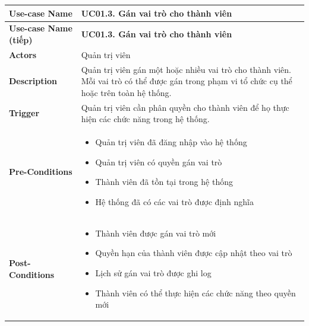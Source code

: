\renewcommand{\arraystretch}{1.3}
\begin{longtable}{|m{}|m{}|}
 \hline

\textbf{Use-case Name} & \textbf{UC01.3. Gán vai trò cho thành viên} \\ \hline
\endfirsthead

\hline
\textbf{Use-case Name (tiếp)} & \textbf{UC01.3. Gán vai trò cho thành viên} \\ \hline
\endhead

\textbf{Actors} 
& Quản trị viên \\ 
\hline

\textbf{Description} 
& Quản trị viên gán một hoặc nhiều vai trò cho thành viên. Mỗi vai trò có thể được gán trong phạm vi tổ chức cụ thể hoặc trên toàn hệ thống. \\ 
\hline

\textbf{Trigger} 
& Quản trị viên cần phân quyền cho thành viên để họ thực hiện các chức năng trong hệ thống. \\ 
\hline

\textbf{Pre-Conditions} 
&
\begin{itemize}[label=--]
    \item Quản trị viên đã đăng nhập vào hệ thống
    \item Quản trị viên có quyền gán vai trò
    \item Thành viên đã tồn tại trong hệ thống
    \item Hệ thống đã có các vai trò được định nghĩa
\end{itemize}
\\ 
\hline

\textbf{Post-Conditions} 
&
\begin{itemize}[label=--]
    \item Thành viên được gán vai trò mới
    \item Quyền hạn của thành viên được cập nhật theo vai trò
    \item Lịch sử gán vai trò được ghi log
    \item Thành viên có thể thực hiện các chức năng theo quyền mới
\end{itemize}
\\ 
\hline


\end{longtable}
